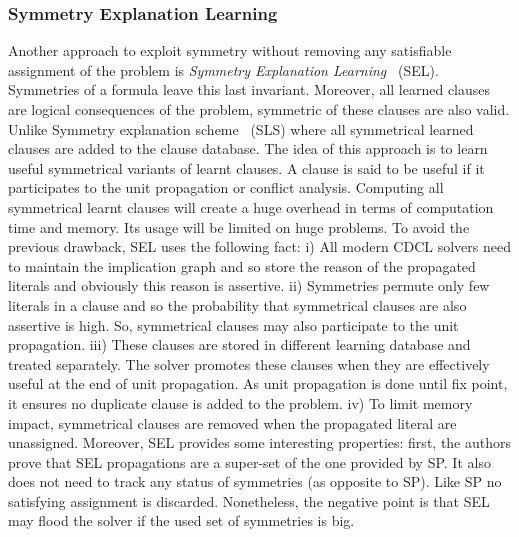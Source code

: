 \subsubsection{Symmetry Explanation Learning}

Another approach to exploit symmetry without removing any satisfiable assignment of the problem
is \emph{Symmetry Explanation Learning}~\cite{devriendt2017symmetric} (SEL). 
Symmetries of a formula leave this last invariant. Moreover, all learned clauses are logical consequences of the problem, symmetric of these clauses are also valid.
Unlike Symmetry explanation scheme~\cite{benhamou2010enhancing} (SLS) where all symmetrical learned clauses
are added to the clause database.
The idea of this approach is to learn useful symmetrical variants of learnt clauses.
 A clause is said to be useful if it participates to the unit propagation or conflict analysis.
Computing all symmetrical learnt clauses will create a huge overhead in terms of computation time and memory.
Its usage will be limited on huge problems.
To avoid the previous drawback, SEL uses the following fact:
i) All modern CDCL solvers need to maintain the implication graph and so store the reason of the propagated literals and
obviously this reason is assertive.
ii) Symmetries permute only few literals in a clause and so the probability that symmetrical clauses are also assertive is high.
So, symmetrical clauses may also participate to the unit propagation.
iii) These clauses are stored in different learning database and 
treated separately. The solver promotes these clauses when they are effectively useful
at the end of unit propagation. As unit propagation is done until fix point, it
ensures no duplicate clause is added to the problem.
iv) To limit memory impact, symmetrical clauses are removed when the propagated literal are unassigned.
Moreover, SEL provides some interesting properties:
first, the authors prove that SEL propagations are a super-set of the one provided by SP. 
It also does not need to track any status of symmetries (as opposite to SP).
Like SP no satisfying assignment is discarded.
Nonetheless, the negative point is that SEL may flood the solver if the used set of symmetries is big. 

